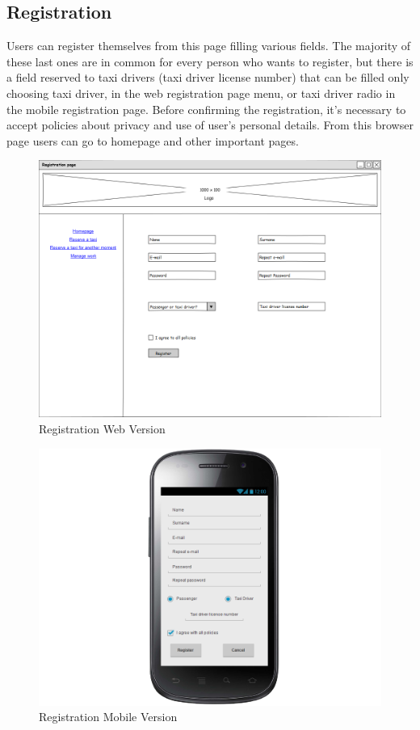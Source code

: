 \subsection{Registration}
Users can register themselves from this page filling various fields. The majority of these last ones are in common for every person who wants to register, but there is a field reserved to taxi drivers (taxi driver license number) that can be filled only choosing taxi driver, in the web registration page menu, or taxi driver radio in the mobile registration page. \newline Before confirming the registration, it's necessary to accept policies about privacy and use of user's personal details. \newline
From this browser page users can go to homepage and other important pages.
\begin{figure}[H]
\centering
\includegraphics[scale=0.35]{mockups/registration_web.png}
\caption{Registration Web Version}
\end{figure}
\begin{figure}[H]
\centering
\includegraphics[scale=0.35]{mockups/registration_mobile.png}
\caption{Registration Mobile Version}
\end{figure}
\break
